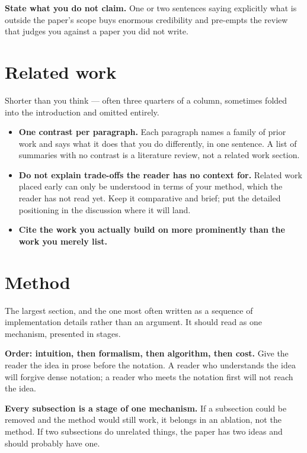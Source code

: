 \documentclass[11pt,a4paper]{article}
\newcommand{\lead}[1]{\medskip\noindent\textbf{#1}\quad}
\begin{document}
\lead{State what you do not claim.} One or two sentences saying explicitly
what is outside the paper's scope buys enormous credibility and pre-empts the
review that judges you against a paper you did not write.

\section{Related work}

Shorter than you think --- often three quarters of a column, sometimes folded
into the introduction and omitted entirely.

\begin{itemize}
  \item \textbf{One contrast per paragraph.} Each paragraph names a family of
    prior work and says what it does that you do differently, in one sentence.
    A list of summaries with no contrast is a literature review, not a related
    work section.
  \item \textbf{Do not explain trade-offs the reader has no context for.}
    Related work placed early can only be understood in terms of your method,
    which the reader has not read yet. Keep it comparative and brief; put the
    detailed positioning in the discussion where it will land.
  \item \textbf{Cite the work you actually build on more prominently than the
    work you merely list.}
\end{itemize}

\section{Method}

The largest section, and the one most often written as a sequence of
implementation details rather than an argument. It should read as one
mechanism, presented in stages.

\lead{Order: intuition, then formalism, then algorithm, then cost.} Give the
reader the idea in prose before the notation. A reader who understands the
idea will forgive dense notation; a reader who meets the notation first will
not reach the idea.

\lead{Every subsection is a stage of one mechanism.} If a subsection could be
removed and the method would still work, it belongs in an ablation, not the
method. If two subsections do unrelated things, the paper has two ideas and
should probably have one.
\end{document}
